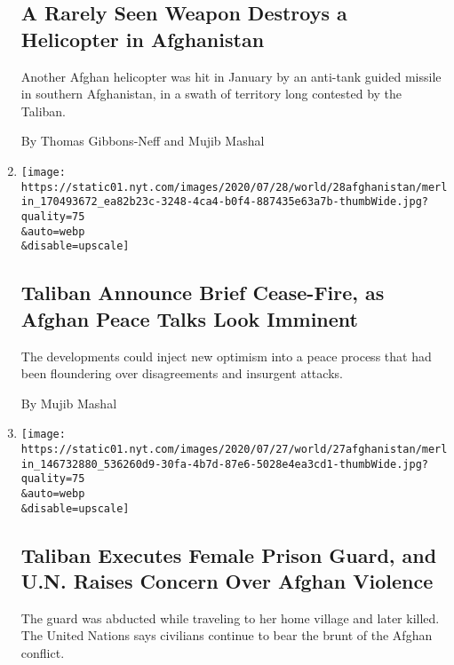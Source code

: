 \begin{enumerate}
{  \subsection{A Rarely Seen Weapon Destroys a Helicopter in
  Afghanistan}\label{a-rarely-seen-weapon-destroys-a-helicopter-in-afghanistan}}

  Another Afghan helicopter was hit in January by an anti-tank guided
  missile in southern Afghanistan, in a swath of territory long
  contested by the Taliban.

  By Thomas Gibbons-Neff and Mujib Mashal
\item
  \href{/2020/07/28/world/asia/afghanistan-cease-fire-taliban.html}{}

  \texttt{[image: https://static01.nyt.com/images/2020/07/28/world/28afghanistan/merlin\_170493672\_ea82b23c-3248-4ca4-b0f4-887435e63a7b-thumbWide.jpg?quality=75\\\&auto=webp\\\&disable=upscale]}

  \hypertarget{taliban-announce-brief-cease-fire-as-afghan-peace-talks-look-imminent}{%
  \subsection{Taliban Announce Brief Cease-Fire, as Afghan Peace Talks
  Look
  Imminent}\label{taliban-announce-brief-cease-fire-as-afghan-peace-talks-look-imminent}}

  The developments could inject new optimism into a peace process that
  had been floundering over disagreements and insurgent attacks.

  By Mujib Mashal
\item
  \href{/2020/07/27/world/asia/taliban-executes-guard-afghanistan.html}{}

  \texttt{[image: https://static01.nyt.com/images/2020/07/27/world/27afghanistan/merlin\_146732880\_536260d9-30fa-4b7d-87e6-5028e4ea3cd1-thumbWide.jpg?quality=75\\\&auto=webp\\\&disable=upscale]}

  \hypertarget{taliban-executes-female-prison-guard-and-un-raises-concern-over-afghan-violence}{%
  \subsection{Taliban Executes Female Prison Guard, and U.N. Raises
  Concern Over Afghan
  Violence}\label{taliban-executes-female-prison-guard-and-un-raises-concern-over-afghan-violence}}

  The guard was abducted while traveling to her home village and later
  killed. The United Nations says civilians continue to bear the brunt
  of the Afghan conflict.


\end{enumerate}
